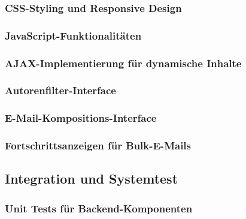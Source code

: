 \documentclass[11pt,a4paper]{article}
\begin{document}
\subsubsection{CSS-Styling und Responsive Design}

\subsubsection{JavaScript-Funktionalitäten}

\subsubsection{AJAX-Implementierung für dynamische Inhalte}

\subsubsection{Autorenfilter-Interface}

\subsubsection{E-Mail-Kompositions-Interface}

\subsubsection{Fortschrittsanzeigen für Bulk-E-Mails}

\subsection{Integration und Systemtest}

\subsubsection{Unit Tests für Backend-Komponenten}
\end{document}
